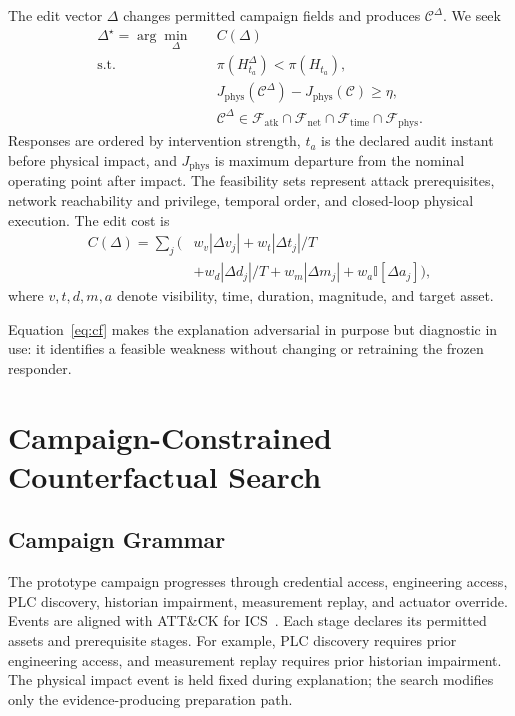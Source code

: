 \documentclass[conference]{IEEEtran}
\begin{document}
The edit vector $\Delta$ changes permitted campaign fields and produces
$\mathcal{C}^{\Delta}$. We seek
\begin{equation}
\begin{aligned}
\Delta^\star = \arg\min_{\Delta}\quad & C(\Delta)\\
\text{s.t.}\quad
& \pi(H_{t_a}^{\Delta}) < \pi(H_{t_a}),\\
& J_{\mathrm{phys}}(\mathcal{C}^{\Delta})
  -J_{\mathrm{phys}}(\mathcal{C}) \geq \eta,\\
& \mathcal{C}^{\Delta}\in
  \mathcal{F}_{\mathrm{atk}}\cap\mathcal{F}_{\mathrm{net}}
  \cap\mathcal{F}_{\mathrm{time}}\cap\mathcal{F}_{\mathrm{phys}}.
\end{aligned}
\label{eq:cf}
\end{equation}
Responses are ordered by intervention strength, $t_a$ is the declared audit
instant before physical impact, and $J_{\mathrm{phys}}$ is maximum departure
from the nominal operating point after impact. The feasibility sets represent
attack prerequisites, network reachability and privilege, temporal order, and
closed-loop physical execution. The edit cost is
\begin{equation}
\begin{aligned}
C(\Delta)=\sum_j\bigl(&w_v|\Delta v_j|+w_t|\Delta t_j|/T\\
 &+w_d|\Delta d_j|/T+w_m|\Delta m_j|
 +w_a\mathbb{I}[\Delta a_j]\bigr),
\end{aligned}
\end{equation}
where $v,t,d,m,a$ denote visibility, time, duration, magnitude, and target
asset.

Equation~\eqref{eq:cf} makes the explanation adversarial in purpose but
diagnostic in use: it identifies a feasible weakness without changing or
retraining the frozen responder.

\section{Campaign-Constrained Counterfactual Search}

\subsection{Campaign Grammar}

The prototype campaign progresses through credential access, engineering access,
PLC discovery, historian impairment, measurement replay, and actuator override.
Events are aligned with ATT\&CK for ICS~\cite{mitreics}. Each stage declares its
permitted assets and prerequisite stages. For example, PLC discovery requires
prior engineering access, and measurement replay requires prior historian
impairment. The physical impact event is held fixed during explanation; the
search modifies only the evidence-producing preparation path.
\end{document}
